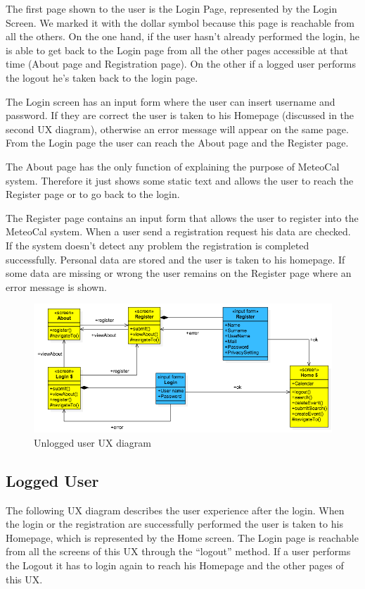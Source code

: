 \documentclass[10pt,a4paper,titlepage]{article}
\begin{document}
The first page shown to the user is the Login Page, represented by the Login Screen. We marked it with the dollar symbol because this page is reachable from all the others. On the one hand, if the user hasn’t already performed the login, he is able to get back to the Login page from all the other pages accessible at that time (About page and Registration page). On the other if a logged user performs the logout he’s taken back to the login page.
 
The Login screen has an input form where the user can insert username and password. If they are correct the user is taken to his Homepage (discussed in the second UX diagram), otherwise an error message will appear on the same page. From the Login page the user can reach the About page and the Register page.

The About page has the only function of explaining the purpose of MeteoCal system. Therefore it just shows some static text and allows the user to reach the Register page or to go back to the login.

The Register page contains an input form that allows the user to register into the MeteoCal system. When a user send a registration request his data are checked. If the system doesn’t detect any problem the registration is completed successfully. Personal data are stored and the user is taken to his homepage. If some data are missing or wrong the user remains on the Register page where an error message is shown.
\clearpage

\begin{figure}[h]
\centering
\includegraphics[width=\linewidth]{./images/UX_unlogged}
\caption[Unlogged ux]{Unlogged user UX diagram}
\label{fig:UX_unlogged}
\end{figure}

\subsection{Logged User}
The following UX diagram describes the user experience after the login. When the login or the registration are successfully performed the user is taken to his Homepage, which is represented by the Home screen. The Login page is reachable from all the screens of this UX through the “logout” method. If a user performs the Logout it has to login again to reach his Homepage and the other pages of this UX.
\end{document}
